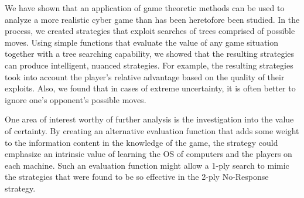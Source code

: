 
We have shown that an application of game theoretic methods can be used
to analyze a more realistic cyber game than has been heretofore been
studied. In the process, we created strategies that exploit searches
of trees comprised of possible moves. Using simple functions that
evaluate the value of any game situation together with a tree
searching capability, we showed that the resulting strategies can
produce intelligent, nuanced strategies. For example, the resulting
strategies took into account the player's relative advantage based on
the quality of their exploits.  Also, we found that in cases of
extreme uncertainty, it is often better to ignore one's opponent's
possible moves.

One area of interest worthy of further analysis is the investigation
into the value of certainty. 
By creating an alternative
evaluation function that adds some weight to the information content in
the knowledge of the game, the strategy could emphasize an intrinsic
value of learning the OS of computers and the players on each
machine. Such an evaluation function might allow a 1-ply search to
mimic the strategies that were found to be so effective in the 2-ply
No-Response strategy.

